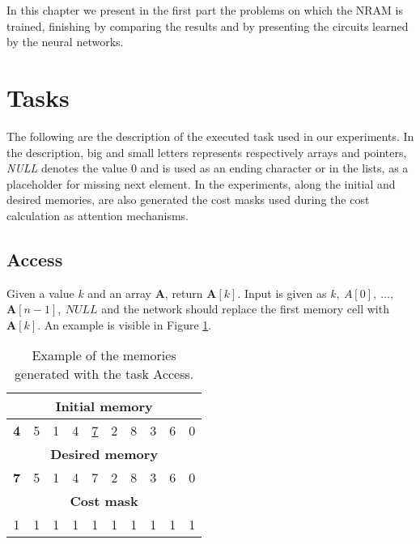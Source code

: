 \label{experiments}
In this chapter we present in the first part the problems on which the NRAM is trained, finishing by comparing the results and by presenting the circuits learned by the neural networks.

\section{Tasks}
The following are the description of the executed task used in our experiments. In the description, big and small letters represents respectively arrays and pointers, \textit{NULL} denotes the value 0 and is used as an ending character or in the lists, as a placeholder for missing next element. In the experiments, along the initial and desired memories, are also generated the cost masks used during the cost calculation as attention mechanisms.

\subsection{Access}
Given a value $k$ and an array \textbf{A}, return $\textbf{A}[k]$. Input is given as $k,\ A[0],\ \dots,\ $\\$\textbf{A}[n-1],\ \textit{NULL}$ and the network should replace the first memory cell with $\textbf{A}[k]$. An example is visible in Figure \ref{fig:access-example}.
\begin{table}[h!]
	\centering
	\begin{tabular}{|c|c|c|c|c|c|c|c|c|c|}
		\hline
		\multicolumn{10}{|c|}{\textbf{Initial memory}} \\ \hline
		\textbf{4} & 5 & 1 & 4 & \underline{7} & 2 & 8 & 3 & 6 & 0 \\ \hline\hline\hline
		\multicolumn{10}{|c|}{\textbf{Desired memory}} \\ \hline
		\textbf{7} & 5 & 1 & 4 & 7 & 2 & 8 & 3 & 6 & 0 \\ \hline\hline\hline
		\multicolumn{10}{|c|}{\textbf{Cost mask}} \\ \hline
		1 & 1 & 1 & 1 & 1 & 1 & 1 & 1 & 1 & 1 \\ \hline
	\end{tabular}
	\caption{Example of the memories generated with the task Access.}
	\label{fig:access-example}
\end{table}
\FloatBarrier

